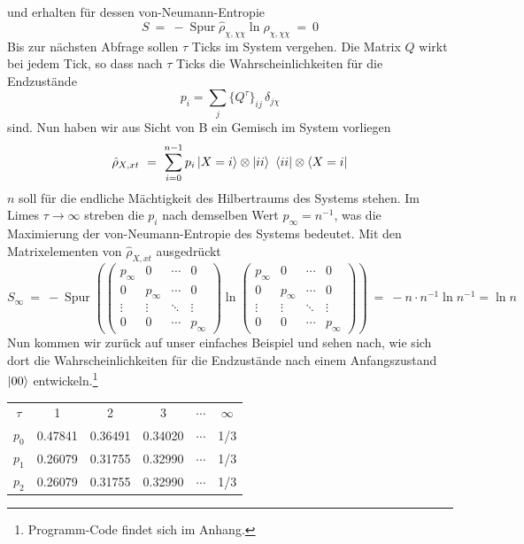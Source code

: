 \documentclass[12pt]{article}
\begin{document}
und erhalten für dessen von-Neumann-Entropie
\begin{equation}
S\ =\ -\operatorname{Spur} \hat{\rho}_{\chi,\chi\chi} \ln \hat{\rho}_{\chi,\chi\chi}\ = \ 0
\end{equation}
Bis zur nächsten Abfrage sollen $\tau$ Ticks im System vergehen. Die Matrix $Q$ wirkt bei jedem Tick, so dass nach $\tau$ Ticks die Wahrscheinlichkeiten für die Endzustände
\begin{equation}
p_i=\sum_j \{Q^\tau\}_{ij}\, \delta_{j\chi}
\end{equation}
sind. Nun haben wir aus Sicht von B ein Gemisch im System vorliegen
\begin{equation}
\hat{\rho}_{X,xt}\ = \ \sum_{i=0}^{n-1} p_i \ket{X=i}\otimes\ket{ii}\ \bra{ii}\otimes\bra{X=i} 
\end{equation}
$n$ soll für die endliche Mächtigkeit des Hilbertraums des Systems stehen. Im Limes $\tau\rightarrow\infty$ streben die $p_i$ nach demselben Wert $p_\infty=n^{-1}$, was die Maximierung der von-Neumann-Entropie des Systems bedeutet. Mit den Matrixelementen von $\hat{\rho}_{X,xt}$ ausgedrückt
\begin{equation}
S_\infty\ =\ -\operatorname{Spur} \left(
\begin{pmatrix}
p_\infty&0&\cdots &0\\
0&p_\infty&\cdots &0\\
\vdots &\vdots &\ddots &\vdots \\
0&0&\cdots &p_\infty
\end{pmatrix}
\ln
\begin{pmatrix}
p_\infty&0&\cdots &0\\
0&p_\infty&\cdots &0\\
\vdots &\vdots &\ddots &\vdots \\
0&0&\cdots &p_\infty
\end{pmatrix} \right)
\ =\ - n \cdot n^{-1} \ln{n^{-1}} = \ln{n}
\end{equation}
Nun kommen wir zurück auf unser einfaches Beispiel und sehen nach, wie sich dort die Wahrscheinlichkeiten für die Endzustände nach einem Anfangszustand $\ket{00}$ entwickeln.\footnote{Programm-Code findet sich im Anhang.}
\begin{center}
\begin{tabular}{ |c|c|c|c|c|c| } 
 \hline
 $\tau$ & 1 & 2 & 3 & $\cdots$ & $\infty$ \\ 
 $p_0$ & 0.47841 & 0.36491 & 0.34020 & $\cdots$ & 1/3 \\
 $p_1$ & 0.26079 & 0.31755 & 0.32990 & $\cdots$ & 1/3 \\
 $p_2$ & 0.26079 & 0.31755 & 0.32990 & $\cdots$ & 1/3 \\
 \hline
\end{tabular}
\end{center}
\end{document}
